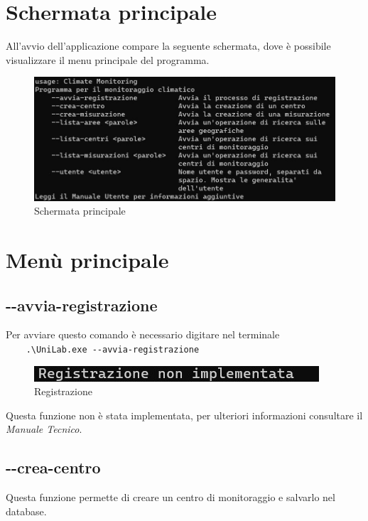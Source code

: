 \documentclass[12pt]{scrreprt}
\begin{document}
	\section{Schermata principale}

	
	All'avvio dell'applicazione compare la seguente schermata, dove \`e possibile visualizzare il menu principale del programma.
	\begin{figure}[H]
		\centering
		\includegraphics[width=0.9\linewidth]{Screen/schermataprincipale}
		\caption{Schermata principale}
		\label{fig:schermataprincipale}
	\end{figure}	
		
	\section{Menù principale}
	
		\subsection{-$ $-avvia-registrazione}
	
		Per avviare questo comando \`e necessario digitare nel terminale\\
		\verb!    .\UniLab.exe --avvia-registrazione!\\
		\begin{figure}[H]
			\centering
			\includegraphics[width=0.5\linewidth]{Screen/registrazione}
			\caption{Registrazione}
			\label{fig:registrazione (non implementata)}
		\end{figure}
			Questa funzione non \`e stata implementata, per ulteriori informazioni consultare il \textsl{Manuale Tecnico}. 
		
		\subsection{-$ $-crea-centro}
		Questa funzione permette di creare un centro di monitoraggio e salvarlo nel database.
		
\end{document}

